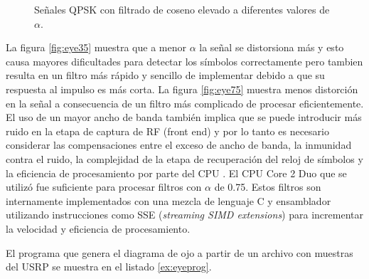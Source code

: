 \begin{figure}[htp]
    \ContinuedFloat
    \centering
    \vspace{0.3in}
    \caption{Se\~nales QPSK con filtrado de coseno elevado a diferentes valores de $\alpha$.}
    \label{fig:rrcsignals}
\end{figure}

La figura \ref{fig:eye35} muestra que a menor $\alpha$ la se\~nal se distorsiona m\'as y esto causa mayores
dificultades para detectar los s\'imbolos correctamente pero tambien resulta en un filtro m\'as r\'apido y
sencillo de implementar debido a que su respuesta al impulso es m\'as corta. La figura
\ref{fig:eye75} muestra menos distorci\'on en la se\~nal a consecuencia de un filtro m\'as complicado de
procesar eficientemente. El uso de un mayor ancho de banda tambi\'en implica que se puede introducir m\'as
ruido en la etapa de captura de RF (front end) y por lo tanto es necesario considerar las
compensaciones entre el exceso de ancho de banda, la inmunidad contra el ruido, la complejidad de
la etapa de recuperaci\'on del reloj de s\'imbolos y la eficiencia de procesamiento por parte del CPU
\cite{lee}. El CPU Core 2 Duo que se utiliz\'o fue suficiente para procesar filtros con $\alpha$ de
0.75. Estos filtros son internamente implementados con una mezcla de lenguaje C y ensamblador utilizando
instrucciones como SSE (\emph{streaming SIMD extensions}) para incrementar la velocidad y eficiencia
de procesamiento.

El programa que genera el diagrama de ojo a partir de un archivo con muestras del USRP se muestra en
el listado \ref{ex:eyeprog}.

